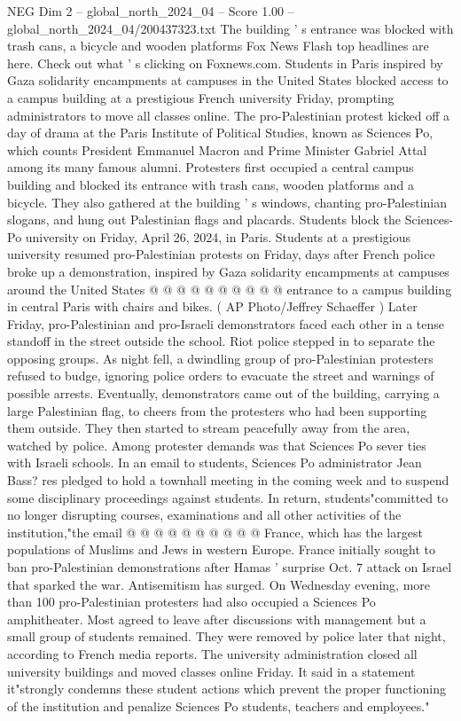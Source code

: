 \begin{textsample}{NEG Dim 2 – global\_north\_2024\_04 – Score 1.00 – global\_north\_2024\_04/200437323.txt}  \label{ex:f2_neg_281}
The building ' s entrance was blocked with trash cans, a bicycle and wooden platforms Fox News Flash top headlines are here.
Check out what ' s clicking on Foxnews.com.
Students in Paris inspired by Gaza solidarity encampments at campuses in the United States blocked access to a campus building at a prestigious French university Friday, prompting administrators to move all classes online.
The pro-Palestinian protest kicked off a day of drama at the Paris Institute of Political Studies, known as Sciences Po, which counts President Emmanuel Macron and Prime Minister Gabriel Attal among its many famous alumni.
Protesters first occupied a central campus building and blocked its entrance with trash cans, wooden platforms and a bicycle.
They also gathered at the building ' s windows, chanting pro-Palestinian slogans, and hung out Palestinian flags and placards.
Students block the Sciences-Po university on Friday, April 26, 2024, in Paris.
Students at a prestigious university resumed pro-Palestinian protests on Friday, days after French police broke up a demonstration, inspired by Gaza solidarity encampments at campuses around the United States @ @ @ @ @ @ @ @ @ @ entrance to a campus building in central Paris with chairs and bikes. ( AP Photo/Jeffrey Schaeffer ) Later Friday, pro-Palestinian and pro-Israeli demonstrators faced each other in a tense standoff in the street outside the school.
Riot police stepped in to separate the opposing groups.
As night fell, a dwindling group of pro-Palestinian protesters refused to budge, ignoring police orders to evacuate the street and warnings of possible arrests.
Eventually, demonstrators came out of the building, carrying a large Palestinian flag, to cheers from the protesters who had been supporting them outside.
They then started to stream peacefully away from the area, watched by police.
Among protester demands was that Sciences Po sever ties with Israeli schools.
In an email to students, Sciences Po administrator Jean Bass? res pledged to hold a townhall meeting in the coming week and to suspend some disciplinary proceedings against students.
In return, students"committed to no longer disrupting courses, examinations and all other activities of the institution,"the email @ @ @ @ @ @ @ @ @ @ France, which has the largest populations of Muslims and Jews in western Europe.
France initially sought to ban pro-Palestinian demonstrations after Hamas ' surprise Oct. 7 attack on Israel that sparked the war.
Antisemitism has surged.
On Wednesday evening, more than 100 pro-Palestinian protesters had also occupied a Sciences Po amphitheater.
Most agreed to leave after discussions with management but a small group of students remained.
They were removed by police later that night, according to French media reports.
The university administration closed all university buildings and moved classes online Friday.
It said in a statement it"strongly condemns these student actions which prevent the proper functioning of the institution and penalize Sciences Po students, teachers and employees."

\end{textsample}
